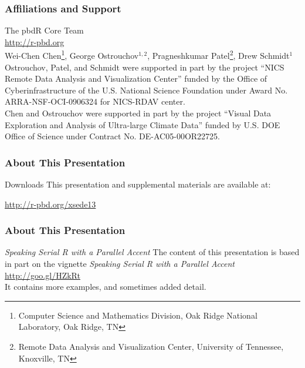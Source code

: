 \frame{
  \maketitle
}

\begin{frame}[noframenumbering]
\frametitle{Affiliations and Support}
{\small
The pbdR Core Team\\ \url{http://r-pbd.org}
\\[.4cm]
Wei-Chen Chen\footnote{\tiny{Computer Science and Mathematics Division, Oak Ridge National Laboratory, Oak Ridge, TN}}, 
George Ostrouchov$^{1,2}$, 
Pragneshkumar Patel\footnote{\tiny{Remote Data Analysis and Visualization Center, University of Tennessee, Knoxville, TN}}, 
Drew Schmidt$^1$
\\[.4cm]
Ostrouchov, Patel, and Schmidt were supported in part by the project
``NICS Remote Data Analysis and Visualization Center''
funded by the Office of Cyberinfrastructure of the
U.S. National Science Foundation
under Award No. ARRA-NSF-OCI-0906324 for NICS-RDAV center.\\[.4cm]
Chen and Ostrouchov were supported in part by the project
``Visual Data Exploration and Analysis of Ultra-large Climate Data''
funded by U.S. DOE Office of Science
under Contract No. DE-AC05-00OR22725.\\
}
\end{frame}

\begin{frame}
\frametitle{About This Presentation}
 \begin{block}{Downloads}
  This presentation and supplemental materials are available at:
  \begin{center}
  \url{http://r-pbd.org/xsede13}
  \end{center}
 \end{block}
\end{frame}


\begin{frame}
\frametitle{About This Presentation}
 \begin{block}{\emph{Speaking Serial R with a Parallel Accent}}
  The content of this presentation is based in part on the  
vignette \emph{Speaking Serial R with a Parallel Accent}\\[.4cm]
  \url{http://goo.gl/HZkRt}\\[.4cm]
  It contains more examples, and sometimes added detail.
 \end{block}
\end{frame}


